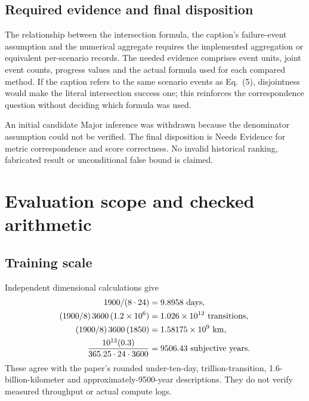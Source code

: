 \documentclass[10pt]{article}
\begin{document}
\subsection*{Required evidence and final disposition}
The relationship between the intersection formula, the caption’s failure-event assumption and the numerical aggregate requires the implemented aggregation or equivalent per-scenario records. The needed evidence comprises event units, joint event counts, progress values and the actual formula used for each compared method. If the caption refers to the same scenario events as Eq. (5), disjointness would make the literal intersection success one; this reinforces the correspondence question without deciding which formula was used.\par
An initial candidate Major inference was withdrawn because the denominator assumption could not be verified. The final disposition is Needs Evidence for metric correspondence and score correctness. No invalid historical ranking, fabricated result or unconditional false bound is claimed.\par
\section*{Evaluation scope and checked arithmetic}
\subsection*{Training scale}
Independent dimensional calculations give \[\begin{aligned}
 1900/(8\cdot24)&=9.8958\ {\rm days},\\
 (1900/8)\,3600\,(1.2\times10^6)
   &=1.026\times10^{12}\ {\rm transitions},\\
 (1900/8)\,3600\,(1850)
   &=1.58175\times10^9\ {\rm km},\\
 \frac{10^{12}(0.3)}{365.25\cdot24\cdot3600}
   &=9506.43\ {\rm subjective\ years}.\end{aligned}\] These agree with the paper’s rounded under-ten-day, trillion-transition, 1.6-billion-kilometer and approximately-9500-year descriptions. They do not verify measured throughput or actual compute logs.\par
\end{document}

